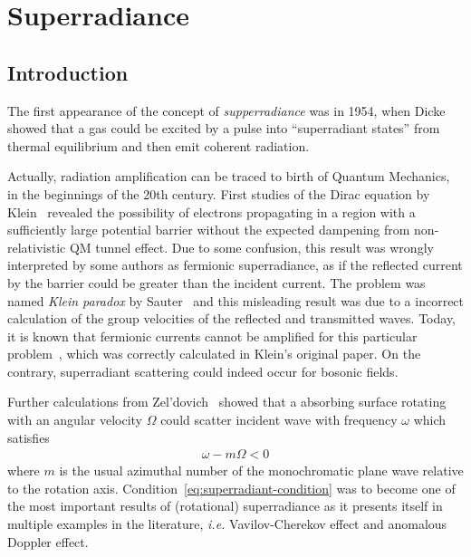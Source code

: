 
\chapter{Superradiance} %
\label{Chapter1} 


\section{Introduction}

The first appearance of the concept of \emph{supperradiance} was in 1954, when Dicke~\cite{Dicke1954} showed that a gas could be excited by a pulse into ``superradiant states'' from thermal equilibrium and then emit coherent radiation. 

Actually, radiation amplification can be traced to birth of Quantum Mechanics, in the beginnings of the 20th century. 
First studies of the Dirac equation by Klein~\cite{Klein1929} revealed the possibility of electrons propagating in a region with a sufficiently large potential barrier without the expected dampening from non-relativistic QM tunnel effect.
Due to some confusion, this result was wrongly interpreted by some authors as fermionic superradiance, as if the reflected current by the barrier could be greater than the incident current. 
The problem was named \emph{Klein paradox} by Sauter~\cite{Sauter1931} and this misleading result was due to a incorrect calculation of the group velocities of the reflected and transmitted waves. 
Today, it is known that fermionic currents cannot be amplified for this particular problem~\cite{Manogue1988, Brito2015}, which was correctly calculated in Klein's original paper. 
On the contrary, superradiant scattering could indeed occur for bosonic fields. 

Further calculations from Zel'dovich~\cite{Zeldovich1971,Zeldovich1972} showed that a absorbing surface rotating with an angular velocity $\Omega$ could scatter incident wave with frequency $\omega$ which satisfies
\begin{align}
    \omega - m \Omega < 0
    \label{eq:superradiant-condition}
\end{align}
where $m$ is the usual azimuthal number of the monochromatic plane wave relative to the rotation axis. 
Condition~\eqref{eq:superradiant-condition} was to become one of the most important results of (rotational) superradiance as it presents itself in multiple examples in the literature, \emph{i.e.} Vavilov-Cherekov effect and anomalous Doppler effect.

